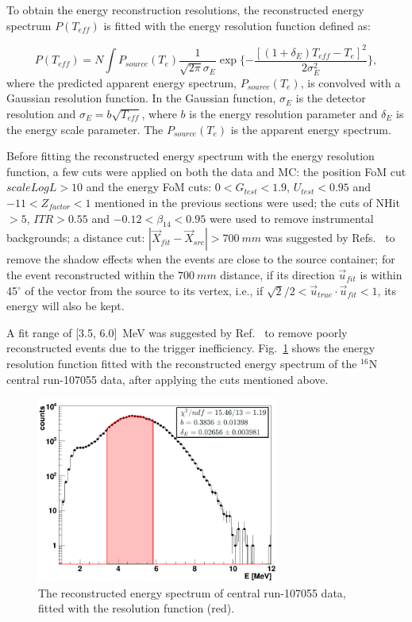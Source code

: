 To obtain the energy reconstruction resolutions, the reconstructed energy spectrum $P(T_{eff})$ is fitted with the energy resolution function defined as\cite{waterunidoc}:

\begin{equation}
P(T_{eff})=N\int P_{source}(T_e)\frac{1}{\sqrt{2\pi}\sigma_E}\exp \{-\frac{[(1+\delta_E)T_{eff}-T_e]^2}{2\sigma_E^2}\},
\end{equation}
where the predicted apparent energy spectrum, $P_{source}(T_e)$, is convolved with a Gaussian resolution function. In the Gaussian function, $\sigma_E$ is the detector resolution and $\sigma_E = b\sqrt {T_{eff}}$, where $b$ is the energy resolution parameter and $\delta_E$ is the energy scale parameter. The $P_{source}(T_e)$ is the apparent energy spectrum.

Before fitting the reconstructed energy spectrum with the energy resolution function, a few cuts were applied on both the data and MC: the position FoM cut $scaleLogL>10$ and the energy FoM cuts: $0<G_{test}<1.9$, $U_{test}<0.95$ and $-11<Z_{factor}<1$ mentioned in the previous sections were used; the cuts of NHit$>5$, $ITR>0.55$ and $-0.12<\beta_{14}<0.95$ were used to remove instrumental backgrounds; a distance cut: $|\vec{X}_{fit}-\vec{X}_{src}|>700~mm$ was suggested by Refs.~\cite{leta,waterunidoc} to remove the shadow effects when the events are close to the source container; for the event reconstructed within the $700~mm$ distance, if its direction $\vec{u}_{fit}$ is within 45$^\circ$ of the vector from the source to its vertex, i.e., if $\sqrt2/2<\vec{u}_{true}\cdot \vec{u}_{fit}<1$, its energy will also be kept.

A fit range of [3.5, 6.0]~MeV was suggested by Ref.~\cite{waterunidoc} to remove poorly reconstructed events due to the trigger inefficiency. Fig.~\ref{fittedEnergyResol} shows the energy resolution function fitted with the reconstructed energy spectrum of the $^{16}$N central run-107055 data, after applying the cuts mentioned above.
\begin{figure}
	\centering
	\includegraphics[width=8cm]{N16data_energy_fitted_107055.png}
	\caption[The reconstructed energy spectrum fitted with resolution function.]{The reconstructed energy spectrum of central run-107055 data, fitted with the resolution function (red).}
	\label{fittedEnergyResol}
\end{figure}

